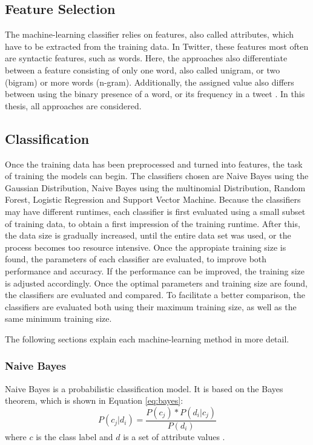 \subsection{Feature Selection}
The machine-learning classifier relies on features, also called attributes, which have to be extracted from the training data. In Twitter, these features most often are syntactic features, such as words. Here, the approaches also differentiate between a feature consisting of only one word, also called unigram, or two (bigram) or more words (n-gram). Additionally, the assigned value also differs between using the binary presence of a word, or its frequency in a tweet \cite{DBLP:journals/csur/GiachanouC16}. In this thesis, all approaches are considered.

\subsection{Classification}
Once the training data has been preprocessed and turned into features, the task of training the models can begin. The classifiers chosen are Naive Bayes using the Gaussian Distribution, Naive Bayes using the multinomial Distribution, Random Forest, Logistic Regression and Support Vector Machine. Because the classifiers may have different runtimes, each classifier is first evaluated using a small subset of training data, to obtain a first impression of the training runtime. After this, the data size is gradually increased, until the entire data set was used, or the process becomes too resource intensive. Once the appropiate training size is found, the parameters of each classifier are evaluated, to improve both performance and accuracy. If the performance can be improved, the training size is adjusted accordingly. Once the optimal parameters and training size are found, the classifiers are evaluated and compared. To facilitate a better comparison, the classifiers are evaluated both using their maximum training size, as well as the same minimum training size.

The following sections explain each machine-learning method in more detail.

    \subsubsection{Naive Bayes}
        Naive Bayes is a probabilistic classification model. It is based on the Bayes theorem, which is shown in Equation \eqref{eq:bayes}:
        \begin{equation}
            \label{eq:bayes}
            P(c_j|d_i) = \frac{P(c_j) * P(d_i|c_j)}{P(d_i)}
        \end{equation}
        where $c$ is the class label and $d$ is a set of attribute values \cite{DBLP:books/aw/TanSKK2019}. 
        
